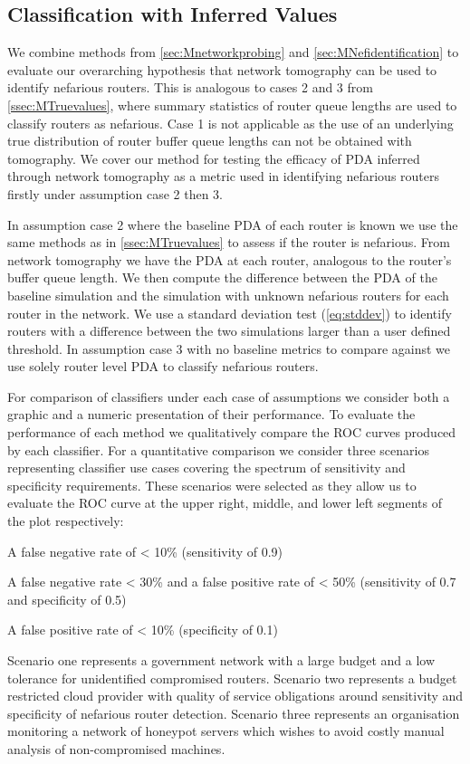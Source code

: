   \subsection{Classification with Inferred Values}
  \label{ssec:MInferredvalues}
  We combine methods from \cref{sec:Mnetworkprobing} and \cref{sec:MNefidentification} to evaluate our overarching hypothesis that network tomography can be used to identify nefarious routers. This is analogous to cases 2 and 3 from \cref{ssec:MTruevalues}, where summary statistics of router queue lengths are used to classify routers as nefarious. Case 1 is not applicable as the use of an underlying true distribution of router buffer queue lengths can not be obtained with tomography. We cover our method for testing the efficacy of PDA inferred through network tomography as a metric used in identifying nefarious routers firstly under assumption case 2 then 3.\par
  In assumption case 2 where the baseline PDA of each router is known we use the same methods as in \cref{ssec:MTruevalues} to assess if the router is nefarious. From network tomography we have the PDA at each router, analogous to the router's buffer queue length. We then compute the difference between the PDA of the baseline simulation and the simulation with unknown nefarious routers for each router in the network. We use a standard deviation test (\cref{eq:stddev}) to identify routers with a difference between the two simulations larger than a user defined threshold. In assumption case 3 with no baseline metrics to compare against we use solely router level PDA to classify nefarious routers.\par
  For comparison of classifiers under each case of assumptions we consider both a graphic and a numeric presentation of their performance. To evaluate the performance of each method we qualitatively compare the ROC curves produced by each classifier. For a quantitative comparison we consider three scenarios representing classifier use cases covering the spectrum of sensitivity and specificity requirements. These scenarios were selected as they allow us to evaluate the ROC curve at the upper right, middle, and lower left segments of the plot respectively: 
    \begin{description}[labelindent=1cm]
      \item[Scenario 1:] A false negative rate of < 10\% (sensitivity of 0.9)
      \item[Scenario 2:] A false negative rate < 30\%  and a false positive rate of < 50\% (sensitivity of 0.7 and specificity of 0.5)
      \item[Scenario 3:] A false positive rate of < 10\% (specificity of 0.1)
  \end{description}
  Scenario one represents a government network with a large budget and a low tolerance for unidentified compromised routers. Scenario two represents a budget restricted cloud provider with quality of service obligations around sensitivity and specificity of nefarious router detection. Scenario three represents an organisation monitoring a network of honeypot servers which wishes to avoid costly manual analysis of non-compromised machines.

